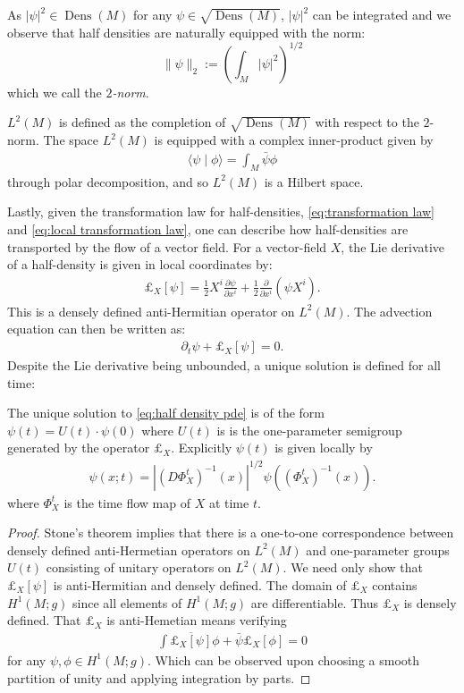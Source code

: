 \documentclass[final,leqno]{siamltex1213}
\newcommand{\pder}[2]{\ensuremath{\frac{ \partial #1}{\partial #2}}}
\DeclareMathOperator{\Dens}{Dens}
\begin{document}
As $|\psi|^{2} \in \Dens(M)$ for any $\psi \in \sqrt{\Dens(M)}$, $|\psi|^{2}$ can be integrated and we observe that half densities are naturally equipped with the norm: $$\| \psi \|_2 :=  \left( \int_M |\psi|^2 \right)^{1/2}$$ which we call the \emph{$2$-norm}.
\begin{definition}
	$L^{2}(M)$ is defined as the completion of $\sqrt{ \Dens(M)}$ with respect to the $2$-norm.
	The space $L^{2}(M)$ is equipped with a complex inner-product given by
	\begin{align}
		\langle \psi \mid \phi \rangle = \int_{M} \bar \psi \phi
	\end{align}
	through polar decomposition, and so $L^{2}(M)$ is a Hilbert space.
\end{definition}

Lastly, given the transformation law for half-densities, \eqref{eq:transformation law} and \eqref{eq:local transformation law}, one can describe how half-densities are transported by the flow of a vector field. 
For a vector-field $X$, the Lie derivative of a half-density is given in local coordinates by:
\begin{align}
	\pounds_{X}[\psi] = \frac{1}{2} X^{i} \pder{\psi}{x^{i}} + \frac{1}{2} \pder{}{x^{i}} \left( \psi X^{i} \right). \label{eq:representation}
\end{align}
This is a densely defined anti-Hermitian operator on $L^{2}(M)$.
The advection equation can then be written as:
\begin{align}
	\partial_{t} \psi + \pounds_{X}[\psi] = 0. \label{eq:half density pde}
\end{align}
Despite the Lie derivative being unbounded, a unique solution is defined for all time:
\begin{proposition} \label{prop:stone}
	The unique solution to \eqref{eq:half density pde} is of the form $\psi(t) = U(t) \cdot \psi(0)$ where $U(t)$ is
	is the one-parameter semigroup generated by the operator $\pounds_{X}$.
	Explicitly $\psi(t)$ is given locally by
	\begin{align}
		\psi(x;t) = \left| (D\Phi_{X}^{t})^{-1} (x) \right|^{1/2} \psi \left( (\Phi_{X}^{t})^{-1}(x) \right).
	\end{align}
	where $\Phi_{X}^{t}$ is the time flow map of $X$ at time $t$.
\end{proposition}
\begin{proof}
	Stone's theorem implies that there is a one-to-one correspondence between densely defined anti-Hermetian operators on $L^{2}(M)$
	and one-parameter groups $U(t)$ consisting of unitary operators on $L^{2}(M)$.
	We need only show that $\pounds_{X}[\psi]$ is anti-Hermitian and densely defined.
	The domain of $\pounds_{X}$ contains $H^{1}(M;g)$ since all elements of $H^{1}(M;g)$ are differentiable.
	Thus $\pounds_{X}$ is densely defined.
	That $\pounds_{X}$ is anti-Hemetian means verifying 
	\begin{align}
		\int \overline{\pounds_{X}[\psi]} \phi + \bar{\psi} \pounds_{X}[\phi] = 0
	\end{align}
	for any $\psi,\phi \in H^{1}(M;g)$.
	Which can be observed upon choosing a smooth partition of unity and applying integration by parts.
\end{proof}
\end{document}
